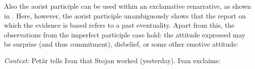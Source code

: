\documentclass[output=paper,
colorlinks,
citecolor=brown,
newtxmath
]{langscibook}
\begin{document}
\noindent Also the aorist participle can be used within an exclamative renarrative, as shown in . Here, however, the aorist participle unambiguously shows that the report on which the evidence is based refers to a past eventuality. Apart from this, the observations from the imperfect participle case hold: the attitude expressed may be surprise (and thus commitment), disbelief, or some other emotive attitude:

\eanoraggedright\label{ex:renarr-excl-aorist}
\textit{Context:} Petăr tells Ivan that Stojan worked (yesterday).
Ivan exclaims:\vspace{-6pt}
\z
\begin{exe}
\end{exe}
\end{document}

